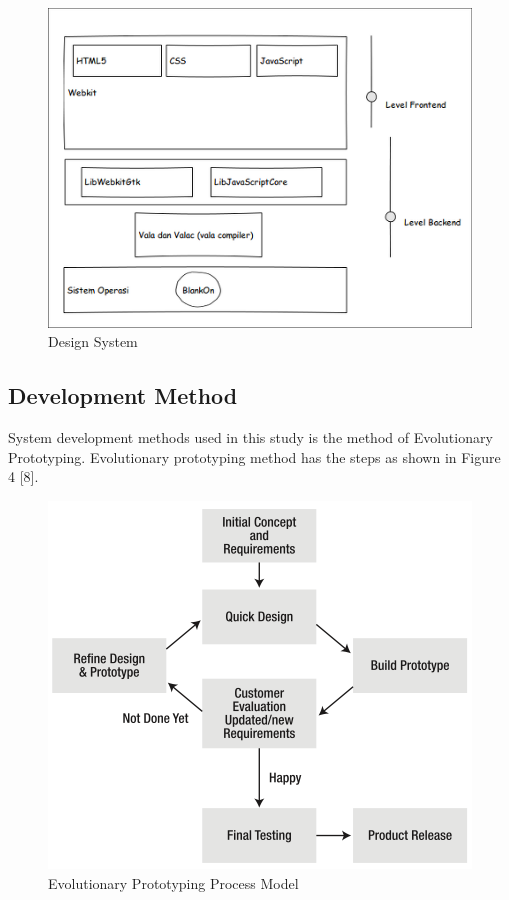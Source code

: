\documentclass[conference, letterpaper]{IEEEtran}
\begin{document}
\begin{figure}[!t]
\centering
\includegraphics[scale=0.5]{image/DesignSystem.png}
\caption{Design System}
\end{figure}

\subsection{Development Method}
System development methods used in this study is the method of Evolutionary Prototyping. Evolutionary prototyping method has the steps as shown in Figure 4 [8].

\begin{figure}[!t]
\centering
\includegraphics[scale=0.5]{image/ep-model.png}
\caption{Evolutionary Prototyping Process Model}
\end{figure}
\end{document}
